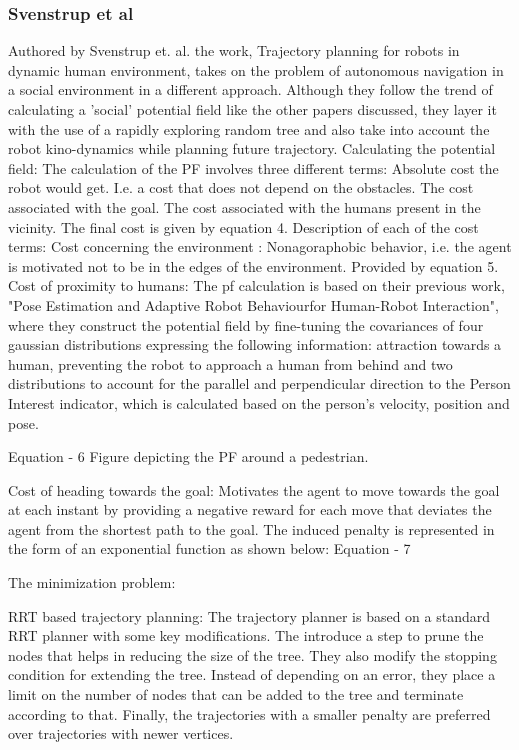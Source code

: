 \subsubsection*{Svenstrup et al}
Authored by Svenstrup et. al. the work, Trajectory planning for robots in dynamic human environment, takes on the problem of autonomous navigation in a social environment in a different approach. Although they follow the trend of calculating a 'social' potential field like the other papers discussed, they layer it with the use of a rapidly exploring random tree and also take into account the robot kino-dynamics while planning future trajectory.
Calculating the potential field:
The calculation of the PF involves three different terms:
Absolute cost the robot would get. I.e. a cost that does not depend on the obstacles.	
The cost associated with the goal.
The cost associated with the humans present in the vicinity.
The final cost is given by equation 4.
Description of each of the cost terms:
Cost concerning the environment :
Nonagoraphobic behavior,  i.e. the agent is motivated not to be in the edges of the environment. Provided by equation 5.
Cost of proximity to humans:
The pf calculation is based on their previous work, "Pose Estimation and Adaptive Robot Behaviourfor Human-Robot Interaction", where they construct the potential field by fine-tuning the covariances of four gaussian distributions expressing the following information: attraction towards a human, preventing the robot to approach a human from behind and two distributions to account for the parallel and perpendicular direction to the Person Interest indicator, which is calculated based on the person's velocity, position and pose.  

Equation - 6
Figure depicting the PF around a pedestrian.

Cost of heading towards the goal:
Motivates the agent to move towards the goal at each instant by providing a  negative reward for each move that deviates the agent from the shortest path to the goal. The induced penalty is represented in the form of an exponential function as shown below:
Equation - 7

The minimization problem:

RRT based trajectory planning:
The trajectory planner is based on a standard RRT planner with some key modifications. The introduce a step to prune the nodes that helps in reducing the size of the tree. They also modify the stopping condition for extending the tree. Instead of depending on an error, they place a limit on the number of nodes that can be added to the tree and terminate according to that. Finally, the trajectories with a smaller penalty are preferred over trajectories with newer vertices.

